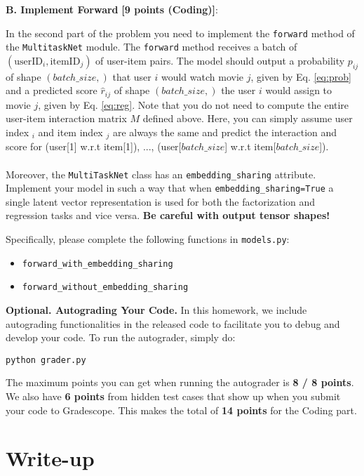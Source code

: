 \documentclass[12pt]{article}
\begin{document}
\noindent \noindent\textbf{B. Implement Forward} \textbf{[9 points (Coding)]}: 

\noindent In the second part of the problem you need to implement the \texttt{forward} method of the \texttt{MultitaskNet} module. The \texttt{forward} method receives a batch of $(\text{userID}_i, \text{itemID}_j)$ of user-item pairs. The model should output a probability $p_{ij}$ of shape $(batch\_size,)$ that user $i$ would watch movie $j$, given by Eq. \ref{eq:prob} and a predicted score $\hat{r}_{ij}$ of shape $(batch\_size,)$ the user $i$ would assign to movie $j$, given by Eq. \ref{eq:reg}. Note that you do not need to compute the entire user-item interaction matrix $M$ defined above. Here, you can simply assume user index $_i$ and item index $_j$ are always the same and predict the interaction and score for (user[1] w.r.t item[1]), ..., (user[$batch\_size$] w.r.t item[$batch\_size$]).
\\\\
\noindent Moreover, the \texttt{MultiTaskNet} class has an \texttt{embedding\_sharing} attribute. Implement your model in such a way that when  \texttt{embedding\_sharing=True} a single latent vector representation is used for both the factorization and regression tasks and vice versa. \textbf{Be careful with output tensor shapes!}

\noindent Specifically, please complete the following functions in \texttt{models.py}:
    \begin{itemize}
        \item \texttt{forward\_with\_embedding\_sharing}
        \item \texttt{forward\_without\_embedding\_sharing}
    \end{itemize}

\noindent\textbf{Optional. Autograding Your Code.}
In this homework, we include autograding functionalities in the released code to facilitate you to debug and develop your code. To run the autograder, simply do:

\texttt{python grader.py}

\noindent The maximum points you can get when running the autograder is \textbf{8 / 8 points}. We also have \textbf{6 points} from hidden test cases that show up when you submit your code to Gradescope. This makes the total of \textbf{14 points} for the Coding part. 


\section{Write-up}
\end{document}
